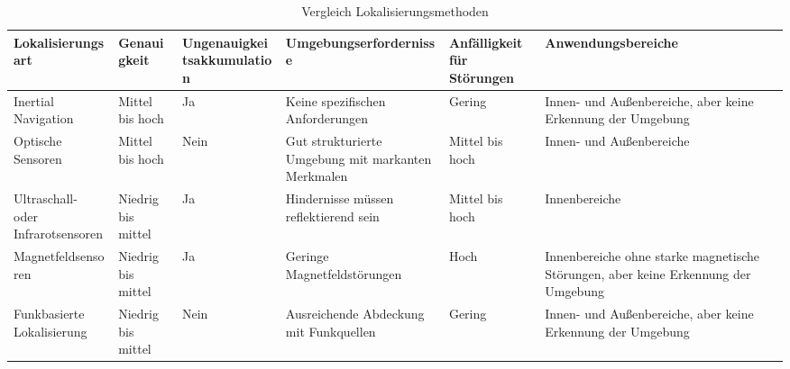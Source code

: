 \begin{table}


\begin{center}
   \fontsize{7}{11}\selectfont
    \begin{tabular}{|p{2cm}|p{2cm}|p{2cm}|p{3cm}|p{2cm}|p{3cm}|}
    \hline
    \textbf{Lokalisier\-ungsart} & \textbf{Genauigkeit} & \textbf{Ungenauigkeits\-akkumulation} & \textbf{Umgebungs\-erfordernisse} & \textbf{Anfälligkeit für Störungen} & \textbf{Anwendungsbereiche} \\\hline
    Inertial Navigation & Mittel bis hoch & Ja & Keine spezifischen Anforderungen & Gering & Innen- und Außenbereiche, aber keine Erkennung der Umgebung \\\hline
    Optische Sensoren & Mittel bis hoch & Nein & Gut strukturierte Umgebung mit markanten Merkmalen & Mittel bis hoch & Innen- und Außenbereiche \\\hline
    Ultraschall- oder Infrarotsensoren & Niedrig bis mittel & Ja & Hindernisse müssen reflektierend sein & Mittel bis hoch & Innenbereiche \\\hline
    Magnetfeld\-sensoren & Niedrig bis mittel & Ja & Geringe Magnetfeldstörungen & Hoch & Innenbereiche ohne starke magnetische Störungen, aber keine Erkennung der Umgebung \\\hline
    Funkbasierte Lokalisierung & Niedrig bis mittel & Nein & Ausreichende Abdeckung mit Funkquellen & Gering & Innen- und Außenbereiche, aber keine Erkennung der Umgebung \\\hline
    \end{tabular}
    \caption{Vergleich Lokalisierungsmethoden}\label{tab:vergleich}
    \end{center}
\end{table}


